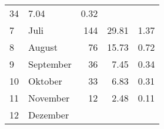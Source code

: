 \begin{longtable}{lXrrr}
       \num{34} &
       \num[round-mode=places,round-precision=2]{7.04} &
         \num[round-mode=places,round-precision=2]{0.32} \\

     7 &
     \multicolumn{1}{X}{ Juli   } &


       \num{144} &
       \num[round-mode=places,round-precision=2]{29.81} &
         \num[round-mode=places,round-precision=2]{1.37} \\

     8 &
     \multicolumn{1}{X}{ August   } &


       \num{76} &
       \num[round-mode=places,round-precision=2]{15.73} &
         \num[round-mode=places,round-precision=2]{0.72} \\

     9 &
     \multicolumn{1}{X}{ September   } &


       \num{36} &
       \num[round-mode=places,round-precision=2]{7.45} &
         \num[round-mode=places,round-precision=2]{0.34} \\

     10 &
     \multicolumn{1}{X}{ Oktober   } &


       \num{33} &
       \num[round-mode=places,round-precision=2]{6.83} &
         \num[round-mode=places,round-precision=2]{0.31} \\

     11 &
     \multicolumn{1}{X}{ November   } &


       \num{12} &
       \num[round-mode=places,round-precision=2]{2.48} &
         \num[round-mode=places,round-precision=2]{0.11} \\

     12 &
     \multicolumn{1}{X}{ Dezember   } &



\end{longtable}
